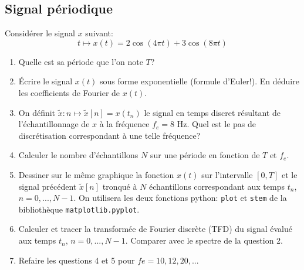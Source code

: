\documentclass{article}
\begin{document}
\subsection*{Signal périodique}
Considérer le signal $x$ suivant:
\[t\mapsto x(t)=2\cos(4\pi t)+3\cos(8\pi t)\]
\begin{enumerate}
\item Quelle est sa période que l'on note $T$?
\item Écrire le signal $x(t)$ sous forme exponentielle (formule d'Euler!). En déduire les coefficients de Fourier de $x(t)$. 
\item On définit $\tilde{x}:n\mapsto \tilde{x}[n]=x(t_n)$ le signal en temps discret résultant de l'échantillonnage de $x$ à la fréquence $f_e=8$ Hz. Quel est le pas de discrétisation correspondant à une telle fréquence?
\item Calculer le nombre d'échantillons $N$ sur une période en fonction de $T$ et $f_e$.
\item Dessiner sur le même graphique la fonction $x(t)$ sur l'intervalle $[0,T]$ et le signal précédent $\tilde{x}[n]$ tronqué à $N$ échantillons correspondant aux temps $t_n$, $n=0,...,N-1$. On utilisera les deux fonctions python: {\tt plot} et {\tt stem} de la bibliothèque {\tt matplotlib.pyplot}.
\item Calculer et tracer la transformée de Fourier discrète (TFD) du signal évalué aux temps $t_n$, $n=0,...,N-1$. Comparer avec le spectre de la question 2.
\item Refaire les questions 4 et 5 pour $fe=10, 12, 20, ...$
\end{enumerate}
\end{document}
